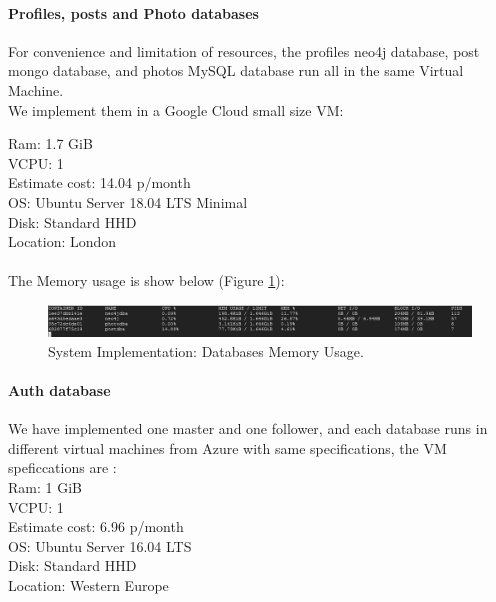 \paragraph{Profiles, posts and Photo databases}
\indent

For convenience and limitation of resources, the profiles neo4j database, post mongo database, and photos MySQL database run all in the same Virtual Machine.
\\

We implement them in a Google Cloud small  size VM:
\\
\indent

Ram: 1.7 GiB
\\
\indent
VCPU: 1
\\
\indent
Estimate cost: 14.04 p/month
\\
\indent
OS: Ubuntu Server 18.04 LTS Minimal
\\
\indent
Disk: Standard HHD
\\
\indent
Location: London
\\
\\
The Memory usage is show below (Figure \ref{se:d1}):
\begin{figure}[H]
	\begin{center}
		\includegraphics[width=170mm,scale=1]{img/implementation/databases-dock-stats.png}
		\caption{System Implementation: Databases Memory Usage.}
		\label{se:d1}
	\end{center}
	
\end{figure}

\paragraph{Auth database}
\indent
We have implemented one master and one follower, and each database runs in different virtual machines from Azure with same specifications, the VM speficcations are : 
\\
\indent
Ram: 1 GiB
\\
\indent
VCPU: 1
\\
\indent
Estimate cost: 6.96 p/month
\\
\indent
OS: Ubuntu Server 16.04 LTS
\\
\indent
Disk: Standard HHD
\\
\indent
Location: Western Europe

